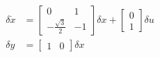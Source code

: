 \documentclass[a4paper, 11pt]{article}
\begin{document}
\begin{subequations}\label{eq:linearized_system}
	\begin{align}
		\delta \dot x & = \begin{bmatrix}
			0 & 1 \\ -\frac{\sqrt{3}}{2} & -1
		\end{bmatrix} \delta x + \begin{bmatrix}
			0 \\ 1
		\end{bmatrix} \delta u \\
		\delta y & = \begin{bmatrix}
			1 & 0
		\end{bmatrix} \delta x
	\end{align}
\end{subequations}
\end{document}
